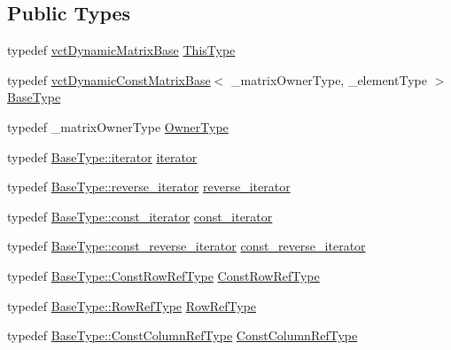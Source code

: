 \subsection*{Public Types}
\begin{DoxyCompactItemize}
\item 
typedef \hyperlink{classvct_dynamic_matrix_base}{vct\+Dynamic\+Matrix\+Base} \hyperlink{classvct_dynamic_matrix_base_afc70802fd7c3e318e8bad4532b945f82}{This\+Type}
\item 
typedef \hyperlink{classvct_dynamic_const_matrix_base}{vct\+Dynamic\+Const\+Matrix\+Base}$<$ \+\_\+matrix\+Owner\+Type, \+\_\+element\+Type $>$ \hyperlink{classvct_dynamic_matrix_base_a6285355f814f82089376c6819d127fd4}{Base\+Type}
\item 
typedef \+\_\+matrix\+Owner\+Type \hyperlink{classvct_dynamic_matrix_base_a224b1f3a25e201d7b45be1da3ac69951}{Owner\+Type}
\item 
typedef \hyperlink{classvct_dynamic_const_matrix_base_aee4b4524b7972fd1b324cba62505a949}{Base\+Type\+::iterator} \hyperlink{classvct_dynamic_matrix_base_a60f380ccdba201f2cec57ec3905b8229}{iterator}
\item 
typedef \hyperlink{classvct_dynamic_const_matrix_base_a53905f35527b9ce433c246ab50a6b812}{Base\+Type\+::reverse\+\_\+iterator} \hyperlink{classvct_dynamic_matrix_base_a5390b4a252fc2e2bbe94cbd19f8c9fa2}{reverse\+\_\+iterator}
\item 
typedef \hyperlink{classvct_dynamic_const_matrix_base_a665b16a8ecd8b6febb4d193efa42205e}{Base\+Type\+::const\+\_\+iterator} \hyperlink{classvct_dynamic_matrix_base_a63eb2ea8f5972efe2f125a8c22b46670}{const\+\_\+iterator}
\item 
typedef \hyperlink{classvct_dynamic_const_matrix_base_afc30420e745eed5f1c838a01088ddc84}{Base\+Type\+::const\+\_\+reverse\+\_\+iterator} \hyperlink{classvct_dynamic_matrix_base_a98a8a7626647cf9dfef10d6b7f7cc9af}{const\+\_\+reverse\+\_\+iterator}
\item 
typedef \hyperlink{classvct_dynamic_const_matrix_base_a42a300cb1afd5f0602ba5c2d7d9cc40b}{Base\+Type\+::\+Const\+Row\+Ref\+Type} \hyperlink{classvct_dynamic_matrix_base_ab7670bc2e61331e4228b9e9fa6885329}{Const\+Row\+Ref\+Type}
\item 
typedef \hyperlink{classvct_dynamic_const_matrix_base_a15b845e745a76559d730ecef10a991b7}{Base\+Type\+::\+Row\+Ref\+Type} \hyperlink{classvct_dynamic_matrix_base_a32b85f46bce5ec110e29208e241f82c3}{Row\+Ref\+Type}
\item 
typedef \hyperlink{classvct_dynamic_const_matrix_base_ac8caf37f979246b1ae99d6e6876879e0}{Base\+Type\+::\+Const\+Column\+Ref\+Type} \hyperlink{classvct_dynamic_matrix_base_a744dadc203a40ef15678bca262d09aad}{Const\+Column\+Ref\+Type}

\end{DoxyCompactItemize}

